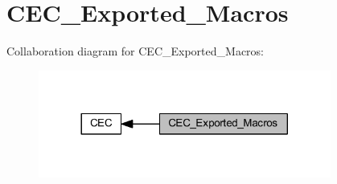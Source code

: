 \hypertarget{group___c_e_c___exported___macros}{}\section{C\+E\+C\+\_\+\+Exported\+\_\+\+Macros}
\label{group___c_e_c___exported___macros}
Collaboration diagram for C\+E\+C\+\_\+\+Exported\+\_\+\+Macros\+:
\nopagebreak
\begin{figure}[H]
\begin{center}
\leavevmode
\includegraphics[width=272pt]{group___c_e_c___exported___macros}
\end{center}
\end{figure}
